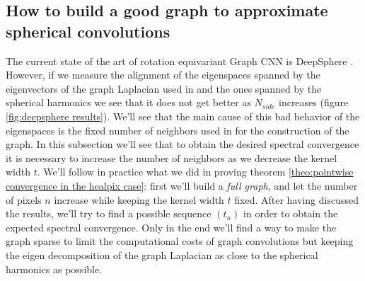 \subsection{How to build a good graph to approximate spherical convolutions}
\label{sec:How to build a good graph}
The current state of the art of rotation equivariant Graph CNN is DeepSphere \cite{DeepSphere}. However, if we measure the alignment of the eigenspaces spanned by the eigenvectors of the graph Laplacian used in \cite{DeepSphere} and the ones spanned by the spherical harmonics we see that it does not get better as $N_{side}$ increases (figure \ref{fig:deepsphere results}). We'll see that the main cause of this bad behavior of the eigenspaces is the fixed number of neighbors used in \cite{DeepSphere} for the construction of the graph. In this subsection we'll see that to obtain the desired spectral convergence it is necessary to increase the number of neighbors as we decrease the kernel width $t$. We'll follow in practice what we did in proving theorem \ref{theo:pointwise convergence in the healpix case}: first we'll build a \textit{full graph}, and let the number of pixels $n$ increase while keeping the kernel width $t$ fixed. After having discussed the results, we'll try to find a possible sequence $(t_n)$ in order to obtain the expected spectral convergence. Only in the end we'll find a way to make the graph sparse to limit the computational costs of graph convolutions but keeping the eigen decomposition of the graph Laplacian as close to the spherical harmonics as possible.
